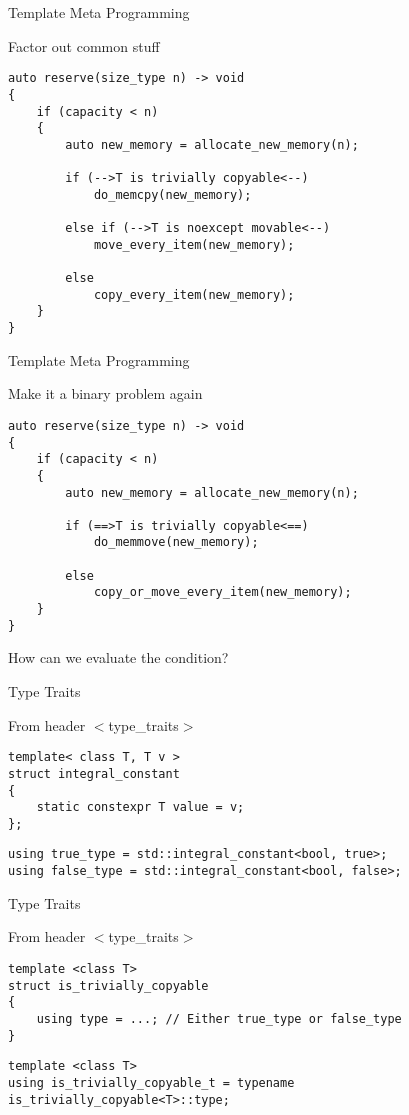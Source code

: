 \documentclass[aspectratio=169,xcolor=dvipsnames]{beamer}
\begin{document}
\begin{frame}[fragile]{Template Meta Programming}
    \begin{block}{Factor out common stuff}
        \begin{lstlisting}
auto reserve(size_type n) -> void
{
    if (capacity < n)
    {
        auto new_memory = allocate_new_memory(n);

        if (-->T is trivially copyable<--)
            do_memcpy(new_memory);

        else if (-->T is noexcept movable<--)
            move_every_item(new_memory);

        else
            copy_every_item(new_memory);
    }
}
        \end{lstlisting}
    \end{block}
\end{frame}

\begin{frame}[fragile]{Template Meta Programming}
    \begin{block}{Make it a binary problem again}
        \begin{lstlisting}
auto reserve(size_type n) -> void
{
    if (capacity < n)
    {
        auto new_memory = allocate_new_memory(n);

        if (==>T is trivially copyable<==)
            do_memmove(new_memory);

        else
            copy_or_move_every_item(new_memory);
    }
}
        \end{lstlisting}
    \end{block}
    How can we evaluate the condition?
\end{frame}

\begin{frame}[fragile]{Type Traits}
    \begin{block}{From header $<$type\_traits$>$}
        \begin{lstlisting}
template< class T, T v >
struct integral_constant
{
    static constexpr T value = v;
};
        \end{lstlisting}
\pause
        \begin{lstlisting}
using true_type = std::integral_constant<bool, true>;
using false_type = std::integral_constant<bool, false>;
        \end{lstlisting}
    \end{block}
\end{frame}

\begin{frame}[fragile]{Type Traits}
    \begin{block}{From header $<$type\_traits$>$}
        \begin{lstlisting}
template <class T>
struct is_trivially_copyable
{
    using type = ...; // Either true_type or false_type
}
        \end{lstlisting}
\pause
        \begin{lstlisting}
template <class T>
using is_trivially_copyable_t = typename is_trivially_copyable<T>::type;
        \end{lstlisting}
    \end{block}
\end{frame}
\end{document}
